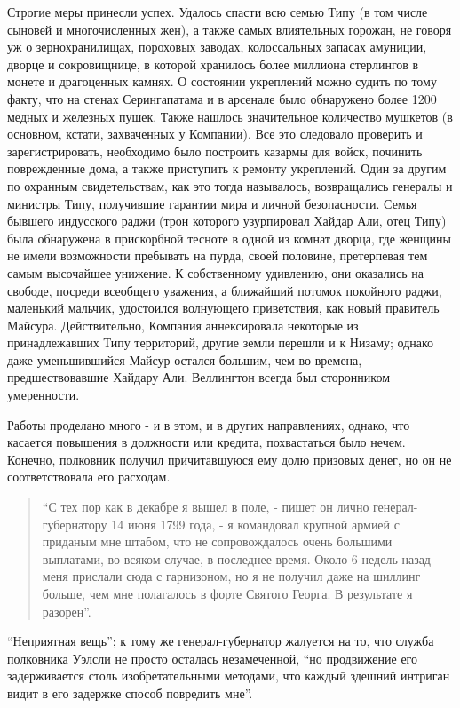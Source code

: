 \documentclass[
  oneside,
  12pt,
  titlepage]{book}
\begin{document}
Строгие меры принесли успех. Удалось спасти всю семью Типу (в том числе сыновей и многочисленных жен), а также самых влиятельных горожан, не говоря уж о зернохранилищах, пороховых заводах, колоссальных запасах амуниции, дворце и сокровищнице, в которой хранилось более миллиона стерлингов в монете и драгоценных камнях. О состоянии укреплений можно судить по тому факту, что на стенах Серингапатама и в арсенале было обнаружено более 1200 медных и железных пушек. Также нашлось значительное количество мушкетов (в основном, кстати, захваченных у Компании). Все это следовало проверить и зарегистрировать, необходимо было построить казармы для войск, починить поврежденные дома, а также приступить к ремонту укреплений. Один за другим по охранным свидетельствам, как это тогда называлось, возвращались генералы и министры Типу, получившие гарантии мира и личной безопасности. Семья бывшего индусского раджи (трон которого узурпировал Хайдар Али, отец Типу) была обнаружена в прискорбной тесноте в одной из комнат дворца, где женщины не имели возможности пребывать на пурда, своей половине, претерпевая тем самым высочайшее унижение. К собственному удивлению, они оказались на свободе, посреди всеобщего уважения, а ближайший потомок покойного раджи, маленький мальчик, удостоился волнующего приветствия, как новый правитель Майсура. Действительно, Компания аннексировала некоторые из принадлежавших Типу территорий, другие земли перешли и к Низаму; однако даже уменьшившийся Майсур остался большим, чем во времена, предшествовавшие Хайдару Али. Веллингтон всегда был сторонником умеренности.

Работы проделано много - и в этом, и в других направлениях, однако, что касается повышения в должности или кредита, похвастаться было нечем. Конечно, полковник получил причитавшуюся ему долю призовых денег, но он не соответствовала его расходам.

\begin{quote}
``С тех пор как в декабре я вышел в поле, - пишет он лично генерал-губернатору 14 июня 1799 года, - я командовал крупной армией с приданым мне штабом, что не сопровождалось очень большими выплатами, во всяком случае, в последнее время. Около 6 недель назад меня прислали сюда с гарнизоном, но я не получил даже на шиллинг больше, чем мне полагалось в форте Святого Георга. В результате я разорен''.
\end{quote}

``Неприятная вещь''; к тому же генерал-губернатор жалуется на то, что служба полковника Уэлсли не просто осталась незамеченной, ``но продвижение его задерживается столь изобретательными методами, что каждый здешний интриган видит в его задержке способ повредить мне''.
\end{document}

